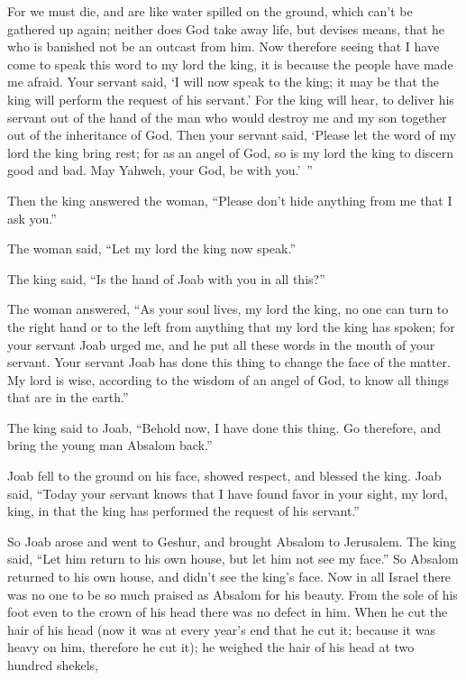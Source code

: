 {For we must die, and are like water spilled on the ground, which can’t be gathered up again; neither does God take away life, but devises means, that he who is banished not be an outcast from him.
Now therefore seeing that I have come to speak this word to my lord the king, it is because the people have made me afraid. Your servant said, ‘I will now speak to the king; it may be that the king will perform the request of his servant.’
For the king will hear, to deliver his servant out of the hand of the man who would destroy me and my son together out of the inheritance of God.
Then your servant said, ‘Please let the word of my lord the king bring rest; for as an angel of God, so is my lord the king to discern good and bad. May Yahweh, your God, be with you.’ ”
\par }{\PP {}Then the king answered the woman, “Please don’t hide anything from me that I ask you.”
\par }{\PP The woman said, “Let my lord the king now speak.”
\par }{\PP {}The king said, “Is the hand of Joab with you in all this?”
\par }{\PP The woman answered, “As your soul lives, my lord the king, no one can turn to the right hand or to the left from anything that my lord the king has spoken; for your servant Joab urged me, and he put all these words in the mouth of your servant.
Your servant Joab has done this thing to change the face of the matter. My lord is wise, according to the wisdom of an angel of God, to know all things that are in the earth.”
\par }{\PP {}The king said to Joab, “Behold now, I have done this thing. Go therefore, and bring the young man Absalom back.”
\par }{\PP {}Joab fell to the ground on his face, showed respect, and blessed the king. Joab said, “Today your servant knows that I have found favor in your sight, my lord, king, in that the king has performed the request of his servant.”
\par }{\PP {}So Joab arose and went to Geshur, and brought Absalom to Jerusalem.
The king said, “Let him return to his own house, but let him not see my face.” So Absalom returned to his own house, and didn’t see the king’s face.
Now in all Israel there was no one to be so much praised as Absalom for his beauty. From the sole of his foot even to the crown of his head there was no defect in him.
When he cut the hair of his head (now it was at every year’s end that he cut it; because it was heavy on him, therefore he cut it); he weighed the hair of his head at two hundred shekels,}
